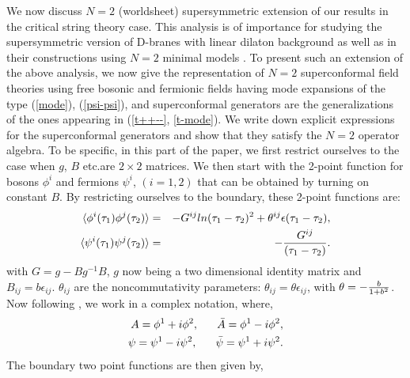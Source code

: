 \documentclass[a4paper,12pt]{article}
\begin{document}
We now discuss $N=2$ (worldsheet) supersymmetric\cite{petersen,zheng} 
extension of our
results in the critical string theory case.   
This analysis is of importance for  studying the supersymmetric 
version of D-branes with linear dilaton background as well as
in their constructions using $N=2$ minimal models \cite{reck}.  
To present such an extension of the above analysis,
we now give the representation of $N=2$ superconformal field 
theories using free bosonic and fermionic fields having  
mode expansions of the type (\ref{mode}), (\ref{psi-psi}),
and superconformal generators are the generalizations of the
ones appearing in  (\ref{t++--}, \ref{t-mode}).
We write down explicit expressions for the superconformal generators 
and show that they satisfy the $N=2$ operator algebra. 
To be specific, in this part of the paper, we first restrict
ourselves to the case when $g$, $B$ etc.are $2\times 2$ matrices. 
We then start with the 2-point function 
for bosons $\phi^i$ and 
fermions $\psi^i$, $(i=1, 2)$ that can be obtained by 
turning on constant $B$. By restricting ourselves to the 
boundary, these 2-point functions are:
\begin{eqnarray}
\langle \phi^i(\tau_1)\phi^j(\tau_2) \rangle  & = &
- G^{i j} ln (\tau_1 - \tau_2)^2
                 + \theta^{ i j} \epsilon(\tau_1 - \tau_2),\nonumber \\
\langle \psi^i(\tau_1) \psi^j(\tau_2) \rangle & = & - {G^{i j}\over 
{(\tau_1 - \tau_2)}}. 
\end{eqnarray}
with $G = g  - B g^{-1} B$, $g$ now being a two dimensional identity 
matrix
and $B_{i j} = b \epsilon_{i j}$. $\theta_{i j}$ are the 
noncommutativity
parameters: $\theta_{i j} = \theta \epsilon_{i j}$, with 
$\theta = - {b\over {1+b^2}}$. 
Now following \cite{zheng}, we work in a complex notation, where,
\begin{eqnarray}
A = \phi^1 + i \phi^2, ~~~~~ \bar{A} = \phi^1 - i \phi^2, \cr
\psi = \psi^1 - i \psi^2, ~~~~~ \bar{\psi} = \psi^1 + i \psi^2.
\label{a-bar-a}
\end{eqnarray}
The boundary two point functions are then given by, 
 
\end{document}
